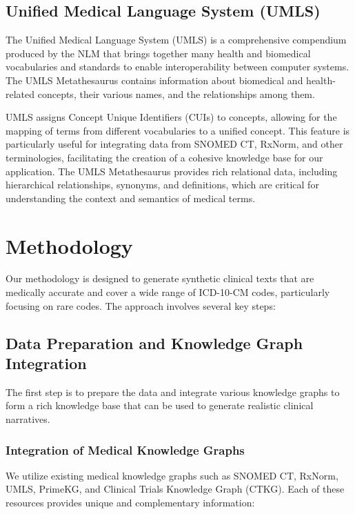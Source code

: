 \documentclass[12pt, a4paper]{article}
\begin{document}
\subsection{Unified Medical Language System (UMLS)}

The Unified Medical Language System (UMLS) is a comprehensive compendium produced by the NLM that brings together many health and biomedical vocabularies and standards to enable interoperability between computer systems. The UMLS Metathesaurus contains information about biomedical and health-related concepts, their various names, and the relationships among them.

UMLS assigns Concept Unique Identifiers (CUIs) to concepts, allowing for the mapping of terms from different vocabularies to a unified concept. This feature is particularly useful for integrating data from SNOMED CT, RxNorm, and other terminologies, facilitating the creation of a cohesive knowledge base for our application. The UMLS Metathesaurus provides rich relational data, including hierarchical relationships, synonyms, and definitions, which are critical for understanding the context and semantics of medical terms.

\section{Methodology}

Our methodology is designed to generate synthetic clinical texts that are medically accurate and cover a wide range of ICD-10-CM codes, particularly focusing on rare codes. The approach involves several key steps:

\subsection{Data Preparation and Knowledge Graph Integration}

The first step is to prepare the data and integrate various knowledge graphs to form a rich knowledge base that can be used to generate realistic clinical narratives.

\subsubsection{Integration of Medical Knowledge Graphs}

We utilize existing medical knowledge graphs such as SNOMED CT, RxNorm, UMLS, PrimeKG, and Clinical Trials Knowledge Graph (CTKG). Each of these resources provides unique and complementary information:
\end{document}
